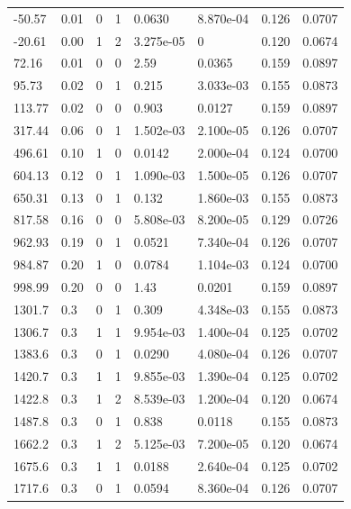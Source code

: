 \documentclass[preview]{standalone}
\begin{document}
{{\begin{tabular}{L{1.2cm}C{1.2cm} C{0.3cm}C{0.5cm} C{1.4cm}C{1.4cm} C{1.4cm}C{1.4cm}}
  -50.57  &  0.01  & 0     &  1 &  0.0630  & 8.870e-04  & 0.126 &  0.0707   \\ 
  -20.61  &  0.00  & 1     &  2 &  3.275e-05  & 0  & 0.120 &  0.0674   \\ 
  72.16  &  0.01  & 0     &  0 &  2.59  & 0.0365  & 0.159 &  0.0897   \\ 
  95.73  &  0.02  & 0     &  1 &  0.215  & 3.033e-03  & 0.155 &  0.0873   \\ 
  113.77  &  0.02  & 0     &  0 &  0.903  & 0.0127  & 0.159 &  0.0897   \\ 
  317.44  &  0.06  & 0     &  1 &  1.502e-03  & 2.100e-05  & 0.126 &  0.0707   \\ 
  496.61  &  0.10  & 1     &  0 &  0.0142  & 2.000e-04  & 0.124 &  0.0700   \\ 
  604.13  &  0.12  & 0     &  1 &  1.090e-03  & 1.500e-05  & 0.126 &  0.0707   \\ 
  650.31  &  0.13  & 0     &  1 &  0.132  & 1.860e-03  & 0.155 &  0.0873   \\ 
  817.58  &  0.16  & 0     &  0 &  5.808e-03  & 8.200e-05  & 0.129 &  0.0726   \\ 
  962.93  &  0.19  & 0     &  1 &  0.0521  & 7.340e-04  & 0.126 &  0.0707   \\ 
  984.87  &  0.20  & 1     &  0 &  0.0784  & 1.104e-03  & 0.124 &  0.0700   \\ 
  998.99  &  0.20  & 0     &  0 &  1.43  & 0.0201  & 0.159 &  0.0897   \\ 
  1301.7  &   0.3  & 0     &  1 &  0.309  & 4.348e-03  & 0.155 &  0.0873   \\ 
  1306.7  &   0.3  & 1     &  1 &  9.954e-03  & 1.400e-04  & 0.125 &  0.0702   \\ 
  1383.6  &   0.3  & 0     &  1 &  0.0290  & 4.080e-04  & 0.126 &  0.0707   \\ 
  1420.7  &   0.3  & 1     &  1 &  9.855e-03  & 1.390e-04  & 0.125 &  0.0702   \\ 
  1422.8  &   0.3  & 1     &  2 &  8.539e-03  & 1.200e-04  & 0.120 &  0.0674   \\ 
  1487.8  &   0.3  & 0     &  1 &  0.838  & 0.0118  & 0.155 &  0.0873   \\ 
  1662.2  &   0.3  & 1     &  2 &  5.125e-03  & 7.200e-05  & 0.120 &  0.0674   \\ 
  1675.6  &   0.3  & 1     &  1 &  0.0188  & 2.640e-04  & 0.125 &  0.0702   \\ 
  1717.6  &   0.3  & 0     &  1 &  0.0594  & 8.360e-04  & 0.126 &  0.0707   \\ 

\end{tabular}}}
\end{document}
